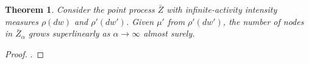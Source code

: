 \documentclass{article}
\newtheorem{theorem}{Theorem}[section]
\begin{document}
\begin{theorem} Consider the point process $\bar{Z}$ with infinite-activity intensity measures $\rho(dw)$ and $\rho'(dw')$. Given $\mu'$ from $\rho'(dw')$, the number of nodes in $\bar{Z}_{\alpha}$ grows superlinearly as $\alpha \rightarrow \infty$ almost surely.
\end{theorem}
\begin{proof}
.
\end{proof}



\end{document}
